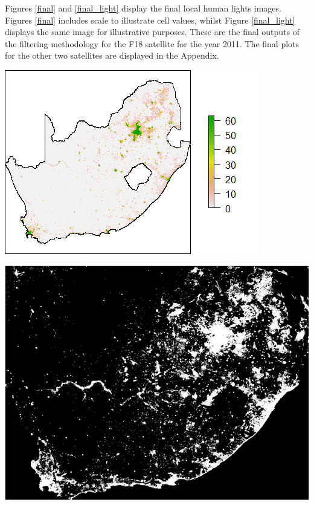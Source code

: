 \documentclass[11pt,preprint, authoryear]{elsarticle}
\let\origfigure\figure
\let\endorigfigure\endfigure
\renewenvironment{figure}[1][2] {
    \expandafter\origfigure\expandafter[H]
} {
    \endorigfigure
}
\numberwithin{equation}{section}
\numberwithin{figure}{section}
\numberwithin{table}{section}
\begin{document}
Figures \ref{final} and \ref{final_light} display the final local human
lights images. Figures \ref{final} includes scale to illustrate cell
values, whilst Figure \ref{final_light} displays the same image for
illustrative purposes. These are the final outputs of the filtering
methodology for the F18 satellite for the year 2011. The final plots for
the other two satellites are displayed in the Appendix.

\begin{figure}[H]
\includegraphics[width=1\linewidth]{figures/final} \caption{\label{final} Local Human Lights Image with Scale }\label{fig:final}
\end{figure}

\begin{figure}[H]
\includegraphics[width=1\linewidth]{figures/local_human_lights_image} \caption{\label{final_light} Local Human Lights Image}\label{fig:final_light}
\end{figure}
\end{document}
